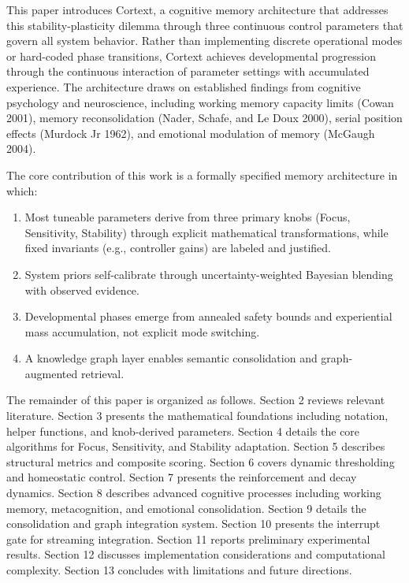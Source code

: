 \documentclass[
  letterpaper,
  DIV=11,
  numbers=noendperiod]{scrartcl}
\providecommand{\tightlist}{%
  \setlength{\itemsep}{0pt}\setlength{\parskip}{0pt}}
\begin{document}
This paper introduces Cortext, a cognitive memory architecture that
addresses this stability-plasticity dilemma through three continuous
control parameters that govern all system behavior. Rather than
implementing discrete operational modes or hard-coded phase transitions,
Cortext achieves developmental progression through the continuous
interaction of parameter settings with accumulated experience. The
architecture draws on established findings from cognitive psychology and
neuroscience, including working memory capacity limits (Cowan 2001),
memory reconsolidation (Nader, Schafe, and Le Doux 2000), serial
position effects (Murdock Jr 1962), and emotional modulation of memory
(McGaugh 2004).

The core contribution of this work is a formally specified memory
architecture in which:

\begin{enumerate}
\def\labelenumi{\arabic{enumi}.}
\tightlist
\item
  Most tuneable parameters derive from three primary knobs (Focus,
  Sensitivity, Stability) through explicit mathematical transformations,
  while fixed invariants (e.g., controller gains) are labeled and
  justified.
\item
  System priors self-calibrate through uncertainty-weighted Bayesian
  blending with observed evidence.
\item
  Developmental phases emerge from annealed safety bounds and
  experiential mass accumulation, not explicit mode switching.
\item
  A knowledge graph layer enables semantic consolidation and
  graph-augmented retrieval.
\end{enumerate}

The remainder of this paper is organized as follows. Section 2 reviews
relevant literature. Section 3 presents the mathematical foundations
including notation, helper functions, and knob-derived parameters.
Section 4 details the core algorithms for Focus, Sensitivity, and
Stability adaptation. Section 5 describes structural metrics and
composite scoring. Section 6 covers dynamic thresholding and homeostatic
control. Section 7 presents the reinforcement and decay dynamics.
Section 8 describes advanced cognitive processes including working
memory, metacognition, and emotional consolidation. Section 9 details
the consolidation and graph integration system. Section 10 presents the
interrupt gate for streaming integration. Section 11 reports preliminary
experimental results. Section 12 discusses implementation considerations
and computational complexity. Section 13 concludes with limitations and
future directions.
\end{document}
